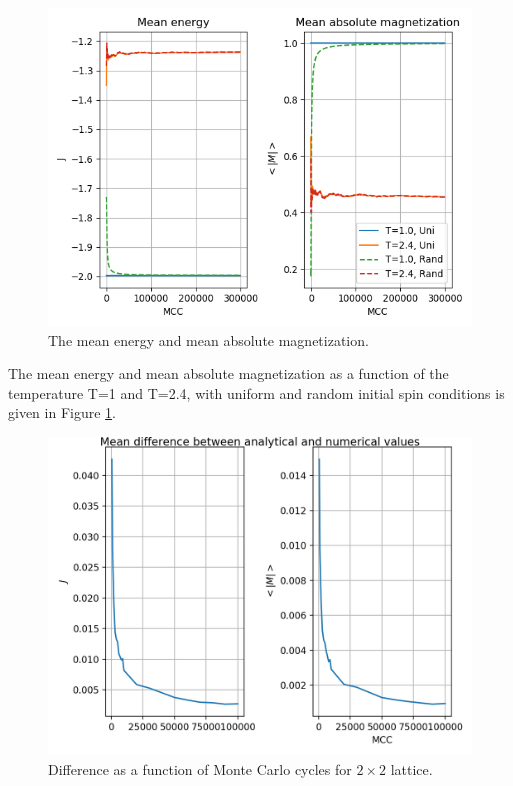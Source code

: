 \documentclass{article}
\begin{document}
\begin{multicols}{2}
\begin{figure}[H]
	\centering
	\includegraphics[width=\linewidth]{Uni_vs_rand.png}
	\caption{The mean energy and mean absolute magnetization.}
	\label{fig:mean_em}
\end{figure}

The mean energy and mean absolute magnetization as a function of the temperature T=1 and T=2.4, with uniform and random initial spin conditions is given in Figure \ref{fig:mean_em}. 

\begin{figure}[H]
	\centering
	\includegraphics[width=\linewidth]{Diff_vs_mcs.png}
	\caption{Difference as a function of Monte Carlo cycles for $2\times2$ lattice.}
	\label{fig:diff_mc}
\end{figure}


\end{multicols}
\end{document}
